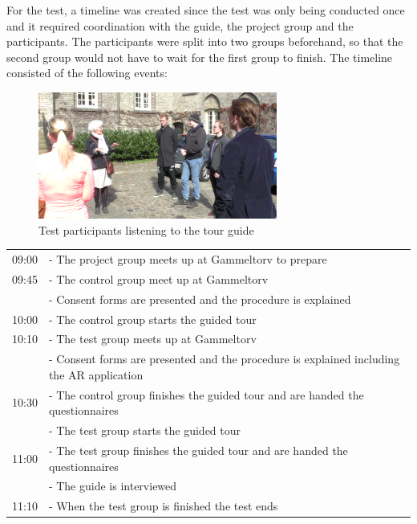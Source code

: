 For the test, a timeline was created since the test was only being conducted once and it required coordination with the guide, the project group and the participants. The participants were split into two groups beforehand, so that the second group would not have to wait for the first group to finish. The timeline consisted of the following events:

\begin{figure}[h!]
   \centering
   \includegraphics[width=0.7\textwidth]{figures/participants_listen.png}
   \caption{Test participants listening to the tour guide}\label{fig:participants_listen}
\end{figure}

\begin{tabular}{l p{12cm}}
09:00 & - The project group meets up at Gammeltorv to prepare \\
09:45 & - The control group meet up at Gammeltorv \\
 & - Consent forms are presented and the procedure is explained \\
10:00 &   - The control group starts the guided tour \\
10:10 & - The test group meets up at Gammeltorv \\
 & - Consent forms are presented and the procedure is explained including the AR application \\
10:30 & - The control group finishes the guided tour and are handed the questionnaires \\
 & - The test group starts the guided tour
\\ 
11:00 & - The test group finishes the guided tour and are handed the questionnaires \\
 & - The guide is interviewed \\
11:10 & - When the test group is finished the test ends \\
\end{tabular}\\
\\

